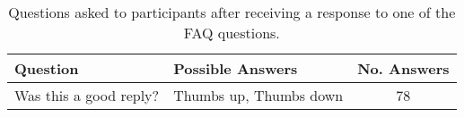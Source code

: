 \renewcommand{\arraystretch}{1.5}
\begin{table}[H]
\centering
{\small
\begin{tabularx}{\textwidth}{@{}X X c@{}}
\toprule
\textbf{Question} & \textbf{Possible Answers} & \textbf{No. Answers} \\ \midrule
Was this a good reply? & Thumbs up, Thumbs down & 78 \\
\bottomrule
\end{tabularx}
}
\vspace{2mm}
\caption{Questions asked to participants after receiving a response to one of the FAQ questions.}
\label{tab:inserted_questions_faq}
\end{table}
